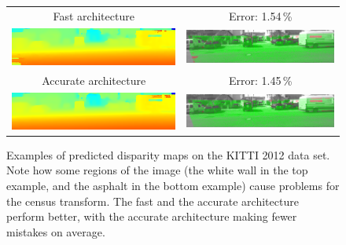 \documentclass[twoside,11pt]{article}
\begin{document}
\begin{figure}[p]
\begin{center}
\begin{tabular}{cc}
Fast architecture &
Error: 1.54\,\% \\
\includegraphics[scale=0.5]{img/kitti_fast_69_pred_.png} &
\includegraphics[scale=0.5]{img/kitti_fast_69_err_.png} \\

Accurate architecture &
Error: 1.45\,\% \\
\includegraphics[scale=0.5]{img/kitti_slow_69_pred_.png} &
\includegraphics[scale=0.5]{img/kitti_slow_69_err_.png}\\
\end{tabular}

\caption{Examples of predicted disparity maps on the KITTI 2012 data set. Note
how some regions of the image (the white wall in the top example, and the
asphalt in the bottom example) cause problems for the census transform. The
fast and the accurate architecture perform better, with the accurate
architecture making fewer mistakes on average.}

\label{fig:kitti2012}
\end{center}
\end{figure}
\end{document}
